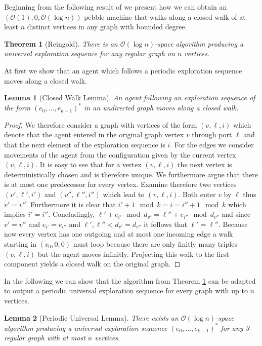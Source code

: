 \documentclass[oneside]{scrartcl}
\newtheorem{thm}{Theorem}
\newtheorem{lem}{Lemma}
\begin{document}
Beginning from the following result of \cite{logspacealg} we present how we can
obtain an $(\mathcal{O}(1),0,\mathcal{O}(\log n))$ pebble machine that walks
along a closed walk of at least $n$ distinct vertices in any graph with bounded
degree.
\begin{thm}[Reingold]
  \label{thm:logalg}
  There is an $\mathcal{O}(\log n)$-space algorithm producing a universal
  exploration sequence for any regular graph on $n$ vertices.
\end{thm}
At first we show that an agent which follows a periodic exploration sequence
moves along a closed walk.
\begin{lem}[Closed Walk Lemma]
  An agent following an exploration sequence of the form
  $(e_{0},\dots,e_{k-1})^{\ast}$ in an undirected graph moves along a closed
  walk.
\end{lem}
\begin{proof}
  We therefore consider a graph with vertices of the form $(v,\ell,i)$ which
  denote that the agent entered in the original graph vertex $v$ through port
  $\ell$ and that the next element of the exploration sequence is $i$. For the
  edges we consider movements of the agent from the configuration given by the
  current vertex $(v,\ell,i)$. It is easy to see that for a vertex $(v,\ell,i)$
  the next vertex is deterministically chosen and is therefore unique. We
  furthermore argue that there is at most one predecessor for every vertex.
  Examine therefore two vertices $(v',\ell',i')$ and $(v'',\ell'',i'')$ which
  lead to $(v,\ell,i)$. Both enter $v$ by $\ell$ thus $v' = v''$. Furthermore
  it is clear that $i' + 1 \mod k = i = i'' + 1 \mod k$ which implies
  $i' = i''$. Concludingly,
  $\ell' + e_{i'} \mod d_{v'} = \ell'' + e_{i''} \mod d_{v''}$ and since
  $v' = v''$ and $e_{i'} = e_{i''}$ and $\ell',\ell'' < d_{v'} = d_{v''}$
  it follows that $\ell' = \ell''$.
  Because now every vertex has one outgoing and at most one incoming edge 
  a walk starting in $(v_{0},0,0)$ must loop
  because there are only finitly many triples $(v,\ell,i)$ but the agent moves
  infinitly. Projecting this walk to the first component yields a closed walk
  on the original graph.
\end{proof}
In the following we can show that the algorithm from Theorem \ref{thm:logalg}
can be adapted to output a periodic universal exploration sequence for every
graph with up to $n$ vertices.
\begin{lem}[Periodic Universal Lemma]
  \label{lem:pul}
  There exists an $\mathcal{O}(\log n)$-space algorithm producing a universal
  exploration sequence $(e_{0},\dots,e_{k-1})^{\ast}$ for any 3-regular graph
  with at most $n$ vertices.
\end{lem}
\end{document}

